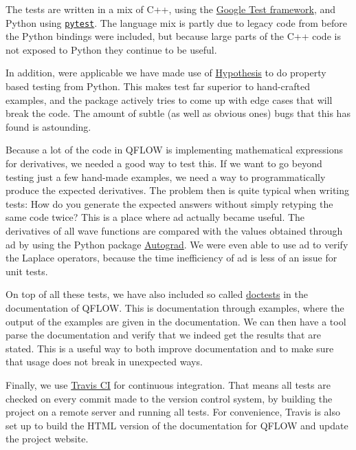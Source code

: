 \documentclass[Thesis.tex]{subfiles}
\begin{document}
The tests are written in a mix of C++, using the
\href{https://github.com/google/googletest}{Google Test framework}, and Python
using \href{https://docs.pytest.org/en/latest/}{\texttt{pytest}}. The language
mix is partly due to legacy code from before the Python bindings were included,
but because large parts of the C++ code is not exposed to Python they continue
to be useful.

In addition, were applicable we have made use of
\href{https://hypothesis.readthedocs.io/en/latest/index.html}{Hypothesis} to do
property based testing from Python. This makes test far superior to hand-crafted examples,
and the package actively tries to come up with edge cases that will break the
code. The amount of subtle (as well as obvious ones) bugs that this has found is
astounding.

Because a lot of the code in QFLOW is implementing mathematical expressions for
derivatives, we needed a good way to test this. If we want to go beyond testing
just a few hand-made examples, we need a way to programmatically produce the
expected derivatives. The problem then is quite typical when writing tests: How
do you generate the expected answers without simply retyping the same code
twice? This is a place where \gls{ad} actually became useful.
The derivatives of all wave functions are compared with the values obtained
through \gls{ad} by using the Python package
\href{https://github.com/HIPS/autograd}{Autograd}. We were even able to use \gls{ad}
to verify the Laplace operators, because the time inefficiency of \gls{ad} is less of
an issue for unit tests.

On top of all these tests, we have also included so called
\href{https://docs.python.org/2/library/doctest.html}{doctests} in the
documentation of QFLOW. This is documentation through examples, where the output
of the examples are given in the documentation. We can then have a tool parse
the documentation and verify that we indeed get the results that are stated.
This is a useful way to both improve documentation and to make sure that usage
does not break in unexpected ways.

Finally, we use \href{https://travis-ci.org/}{Travis CI} for continuous
integration. That means all tests are checked on every commit made to the version control
system, by building the project on a remote server and running all tests. For
convenience, Travis is also set up to build the HTML version of the
documentation for QFLOW and update the project website.
\end{document}
